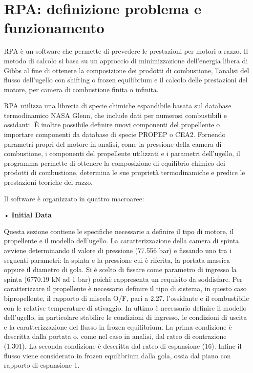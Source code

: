 \section{RPA: definizione problema e funzionamento}
\label{appendix:rpa}
RPA è un software che permette di prevedere le prestazioni per motori a razzo. Il metodo di calcolo si basa su un approccio di minimizzazione dell'energia libera di Gibbs al fine di ottenere la composizione dei prodotti di combustione, l'analisi del flusso dell'ugello con shifting o frozen equilibrium e il calcolo delle prestazioni del motore, per camera di combustione finita o infinita.

RPA utilizza una libreria di specie chimiche espandibile basata sul database termodinamico NASA Glenn, che include dati per numerosi combustibili e ossidanti. È inoltre possibile definire nuovi componenti del propellente o importare componenti da database di specie PROPEP o CEA2.
Fornendo parametri propri del motore in analisi, come la pressione della camera di combustione, i componenti del propellente utilizzati e i parametri dell'ugello, il programma permette di ottenere la composizione di equilibrio chimico dei prodotti di combustione, determina le sue proprietà termodinamiche e predice le prestazioni teoriche del razzo. 

Il software è organizzato in quattro macroaree: 

• \textbf{Initial Data}

Questa sezione contiene le specifiche necessarie a definire il tipo di motore, il propellente e il modello dell'ugello.
La caratterizzazione della camera di spinta avviene determinando il valore di pressione (77.556 bar) e fissando uno tra i seguenti parametri: la spinta e la pressione cui è riferita, la portata massica oppure il diametro di gola. Si è scelto di fissare come parametro di ingresso la spinta (6770.19 kN ad 1 bar) poichè rappresenta un requisito da soddisfare.
Per caratterizzare il propellente è necessario definire il tipo di sistema, in questo caso bipropellente, il rapporto di miscela O/F, pari a 2.27, l'ossidante e il combustibile con le relative temperature di stivaggio. 
In ultimo è necessario definire il modello dell'ugello, in particolare stabilire le condizioni di ingresso, le condizioni di uscita e la caratterizzazione del flusso in frozen equilibrium. La prima condizione è descritta dalla portata o, come nel caso in analisi, dal rateo di contrazione (1.301). La seconda condizione è descritta dal rateo di espansione (16). Infine il flusso viene considerato in frozen equilibrium dalla gola, ossia dal piano con rapporto di espansione 1.

